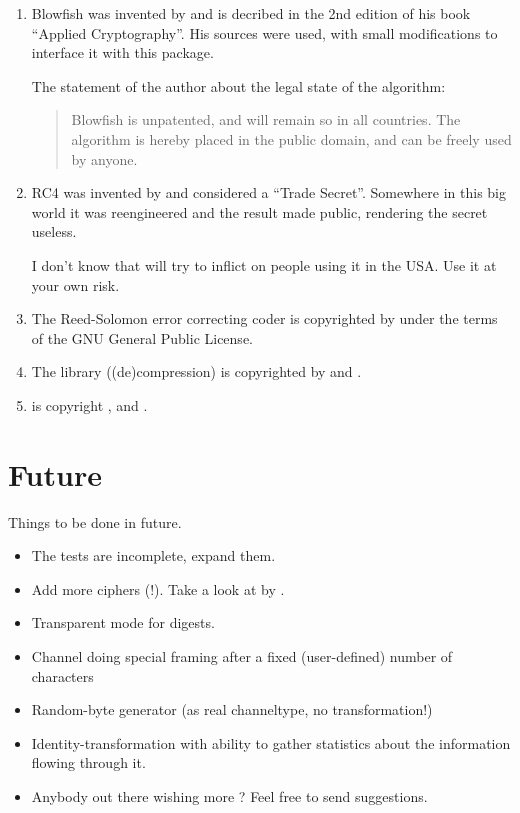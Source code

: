 \documentclass {report}
\begin{document}
\begin {enumerate}
\item	Blowfish was invented by \schneier{} and is decribed in the
	2nd edition of his book ``Applied Cryptography''. His sources
	were used, with small modifications to interface it with this
	package.

	The statement of the author about the legal state of the
	algorithm:

	\begin {quotation}
		Blowfish is unpatented, and will remain so in all
		countries. The algorithm is hereby placed in the
		public domain, and can be freely used by anyone.
	\end {quotation}

\item	RC4 was invented by \rsadsi{} and considered a ``Trade
	Secret''. Somewhere in this big world it was reengineered and
	the result made public, rendering the secret useless.

	I don't know that \rsadsi will try to inflict on people using
	it in the USA. Use it at your own risk.

\item	The Reed-Solomon error correcting coder is copyrighted by
	\paulf{} under the terms of the GNU General Public License.

\item	The library \zlib{} ((de)compression) is copyrighted by
	\jlgailly{} and \madler.

\item	\rmd{} is copyright \dobbertin{}, \bosselaers{} and \preneel{}.
\end   {enumerate}


\chapter {Future}

Things to be done in future.

\begin {itemize}
\item	The tests are incomplete, expand them.
\item	Add more ciphers (\PGP!). Take a look at \pgplib{} by \tage{}.
\item	Transparent mode for digests.
\item	Channel doing special framing after a fixed (user-defined)
	number of characters
\item	Random-byte generator (as real channeltype, no transformation!)
\item	Identity-transformation with ability to gather statistics
	about the information flowing through it.
\item	Anybody out there wishing more ? Feel free to send \me{}
	suggestions.
\end   {itemize}
\end{document}
